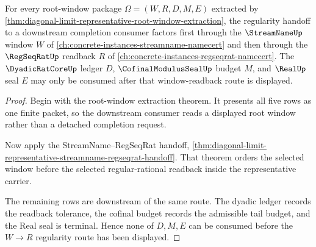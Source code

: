 \begin{theorem}
\label{thm:diagonal-limit-representative-regularity-handoff}
For every root-window package $\Omega=(W,R,D,M,E)$ extracted by \autoref{thm:diagonal-limit-representative-root-window-extraction}, the regularity handoff to a downstream completion consumer factors first through the $\StreamNameUp$ window $W$ of \autoref{ch:concrete-instances-streamname-namecert} and then through the $\RegSeqRatUp$ readback $R$ of \autoref{ch:concrete-instances-regseqrat-namecert}. The $\DyadicRatCoreUp$ ledger $D$, $\CofinalModulusSealUp$ budget $M$, and $\RealUp$ seal $E$ may only be consumed after that window-readback route is displayed.
\end{theorem}
\begin{proof}
Begin with the root-window extraction theorem. It presents all five rows as one finite packet, so the downstream consumer reads a displayed root window rather than a detached completion request.

Now apply the StreamName--RegSeqRat handoff, \autoref{thm:diagonal-limit-representative-streamname-regseqrat-handoff}. That theorem orders the selected window before the selected regular-rational readback inside the representative carrier.

The remaining rows are downstream of the same route. The dyadic ledger records the readback tolerance, the cofinal budget records the admissible tail budget, and the Real seal is terminal. Hence none of $D,M,E$ can be consumed before the $W \to R$ regularity route has been displayed.
\end{proof}


